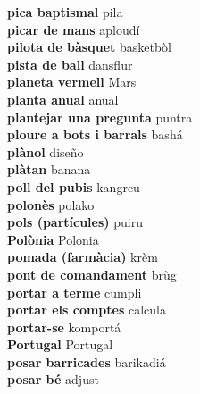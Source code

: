 \textbf{ pica baptismal  } pila \\
\textbf{ picar de mans  } aploudí \\
\textbf{ pilota de bàsquet  } basketbòl \\
\textbf{ pista de ball  } dansflur \\
\textbf{ planeta vermell  } Mars \\
\textbf{ planta anual  } anual \\
\textbf{ plantejar una pregunta  } puntra \\
\textbf{ ploure a bots i barrals  } bashá \\
\textbf{ plànol  } diseño \\
\textbf{ plàtan  } banana \\
\textbf{ poll del pubis  } kangreu \\
\textbf{ polonès  } polako \\
\textbf{ pols (partícules)  } puiru \\
\textbf{ Polònia  } Polonia \\
\textbf{ pomada (farmàcia)  } krèm \\
\textbf{ pont de comandament  } brùg \\
\textbf{ portar a terme  } cumpli \\
\textbf{ portar els comptes  } calcula \\
\textbf{ portar-se  } komportá \\
\textbf{ Portugal  } Portugal \\
\textbf{ posar barricades  } barikadiá \\
\textbf{ posar bé  } adjust \\
